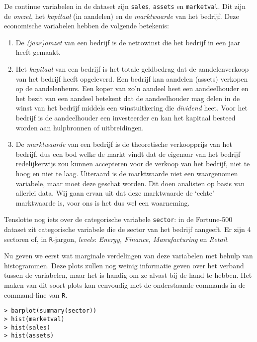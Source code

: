 \documentclass[a4paper, notitlepage]{report}
\begin{document}
  De continue variabelen in de dataset zijn \verb!sales!, \verb!assets! en \verb!marketval!. Dit zijn de \emph{omzet}, het \emph{kapitaal} (in aandelen) en de \emph{marktwaarde} van het bedrijf. Deze economische variabelen hebben de volgende betekenis:
  
\begin{enumerate}
  \item De \emph{(jaar)omzet} van een bedrijf is de nettowinst die het bedrijf in een jaar heeft gemaakt.
  \item Het \emph{kapitaal} van een bedrijf is het totale geldbedrag dat de aandelenverkoop van het bedrijf heeft opgeleverd. Een bedrijf kan aandelen (assets) verkopen op de aandelenbeurs. Een koper van zo'n aandeel heet een aandeelhouder en het bezit van een aandeel betekent dat de aandeelhouder mag delen in de winst van het bedrijf middels een winstuitkering die \emph{dividend} heet. Voor het bedrijf is de aandeelhouder een investeerder en kan het kapitaal besteed worden aan hulpbronnen of uitbreidingen.
  \item De \emph{marktwaarde} van een bedrijf is de theoretische verkoopprijs van het bedrijf, dus een bod welke de markt vindt dat de eigenaar van het bedrijf redelijkerwijs zou kunnen accepteren voor de verkoop van het bedrijf, niet te hoog en niet te laag. Uiteraard is de marktwaarde niet een waargenomen variabele, maar moet deze geschat worden. Dit doen analisten op basis van allerlei data. Wij gaan ervan uit dat deze marktwaarde de `echte' marktwaarde is, voor ons is het dus wel een waarneming.
\end{enumerate}
  
  Tenslotte nog iets over de categorische variabele \verb!sector!: in de Fortune-500 dataset zit categorische variabele die de sector van het bedrijf aangeeft. Er zijn 4 sectoren of, in \verb!R!-jargon, \emph{levels}: \emph{Energy, Finance, Manufacturing} en \emph{Retail}. 
  
  Nu geven we eerst wat marginale verdelingen van deze variabelen met behulp van histogrammen. Deze plots zullen nog weinig informatie geven over het verband tussen de variabelen, maar het is handig om ze alvast bij de hand te hebben. Het maken van dit soort plots kan eenvoudig met de onderstaande commands in de command-line van \verb!R!.

\begin{verbatim}
> barplot(summary(sector))
> hist(marketval)
> hist(sales)
> hist(assets)
\end{verbatim}
\end{document}
